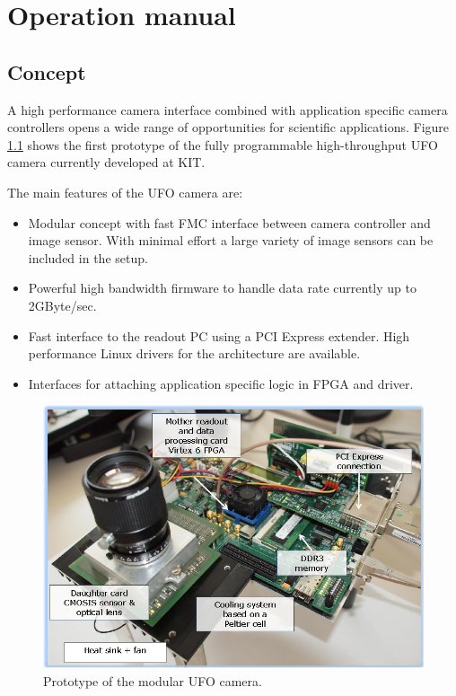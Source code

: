 %

\chapter{Operation manual}

\section{Concept}

A high performance camera interface combined with application specific camera controllers opens 
a wide range of opportunities for scientific applications. Figure \ref{camera-setup} shows the first 
prototype of the fully programmable high-throughput UFO camera currently developed at KIT. 

The main features of the UFO camera are:

\begin{itemize}
\item Modular concept with fast FMC interface between camera controller and image sensor. With minimal effort a large variety of image sensors can be included in the setup.
\item Powerful high bandwidth firmware to handle data rate currently up to 2GByte/sec.
\item Fast interface to the readout PC using a PCI Express extender. High performance Linux drivers for the architecture are available.
\item Interfaces for attaching application specific logic in FPGA and driver.
\end{itemize}

\begin{figure}
\includegraphics[width=\textwidth]{images/Figure_2.png}
\caption{\label{camera-setup} Prototype of the modular UFO camera.}
\end{figure}




